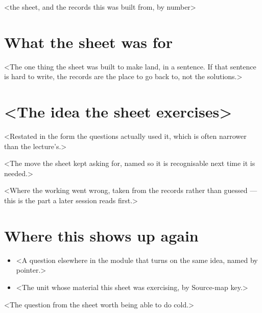 \documentclass[a4paper,10pt]{article}
\begin{document}
%
  {<the sheet, and the records this was built from, by number>}

\section{What the sheet was for}
<The one thing the sheet was built to make land, in a sentence. If that sentence is hard to write,
the records are the place to go back to, not the solutions.>

\section{<The idea the sheet exercises>}

\begin{defn}[<term>]
<Restated in the form the questions actually used it, which is often narrower than the lecture's.>
\end{defn}

\begin{remark}
<The move the sheet kept asking for, named so it is recognisable next time it is needed.>
\end{remark}

\begin{warning}
<Where the working went wrong, taken from the records rather than guessed — this is the part a
later session reads first.>
\end{warning}

\section{Where this shows up again}
\begin{itemize}
  \item <A question elsewhere in the module that turns on the same idea, named by pointer.>
  \item <The unit whose material this sheet was exercising, by Source-map key.>
\end{itemize}

\begin{checkyourself}
  \item <The question from the sheet worth being able to do cold.>
\end{checkyourself}
\end{document}
